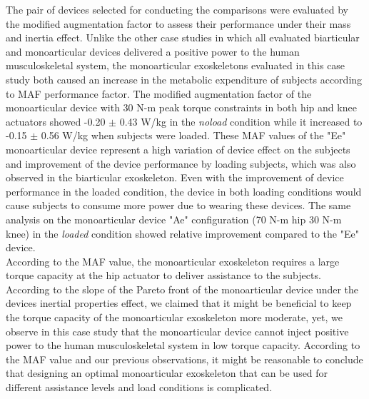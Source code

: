 \documentclass[10pt,letterpaper]{article}
\begin{document}
The pair of devices selected for conducting the comparisons were evaluated by the modified augmentation factor to assess their performance under their mass and inertia effect. Unlike the other case studies in which all evaluated biarticular and monoarticular devices delivered a positive power to the human musculoskeletal system, the monoarticular exoskeletons evaluated in this case study both caused an increase in the metabolic expenditure of subjects according to MAF performance factor. The modified augmentation factor of the monoarticular device with 30 N-m peak torque constraints in both hip and knee actuators showed -0.20 $\pm$ 0.43 W/kg in the {\it noload} condition while it increased to -0.15 $\pm$ 0.56 W/kg when subjects were loaded. These MAF values of the "Ee" monoarticular device represent a high variation of device effect on the subjects and improvement of the device performance by loading subjects, which was also observed in the biarticular exoskeleton. Even with the improvement of device performance in the loaded condition, the device in both loading conditions would cause subjects to consume more power due to wearing these devices. The same analysis on the monoarticular device "Ae" configuration (70 N-m hip 30 N-m knee) in the {\it loaded} condition showed relative improvement compared to the "Ee" device.\\
According to the MAF value, the monoarticular exoskeleton requires a large torque capacity at the hip actuator to deliver assistance to the subjects. According to the slope of the Pareto front of the monoarticular device under the devices inertial properties effect, we claimed that it might be beneficial to keep the torque capacity of the monoarticular exoskeleton more moderate, yet, we observe in this case study that the monoarticular device cannot inject positive power to the human musculoskeletal system in low torque capacity. According to the MAF value and our previous observations, it might be reasonable to conclude that designing an optimal monoarticular exoskeleton that can be used for different assistance levels and load conditions is complicated.\\
\end{document}
